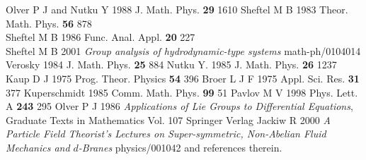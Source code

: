\documentclass[a4paper,12pt]{article}
\begin{document}
\begin{thebibliography}{99}
 Olver P J and Nutku Y 1988 J. Math. Phys. {\bf 29} 1610
 Sheftel M B 1983 Theor. Math. Phys. {\bf 56}
878\\ Sheftel M B 1986 Func. Anal. Appl. {\bf 20} 227 \\ Sheftel M
B 2001 {\it Group analysis of hydrodynamic-type systems}
math-ph/0104014
 Verosky 1984 J. Math. Phys. {\bf 25} 884
 Nutku Y. 1985 J. Math. Phys. {\bf 26} 1237
 Kaup D J 1975 Prog. Theor. Physics {\bf 54} 396
 Broer L J F 1975 Appl. Sci. Res. {\bf 31} 377
 Kuperschmidt 1985 Comm. Math. Phys. {\bf 99} 51
 Pavlov M V 1998 Phys. Lett. A {\bf 243} 295
 Olver P J 1986 {\it Applications of Lie Groups
to Differential Equations}, Graduate
Texts in Mathematics Vol. 107 Springer Verlag
 Jackiw R 2000 {\it A Particle Field Theorist's Lectures
on Super-symmetric, Non-Abelian Fluid Mechanics and $d$-Branes}
physics/001042 and references therein.
\end{thebibliography}
\end{document}

